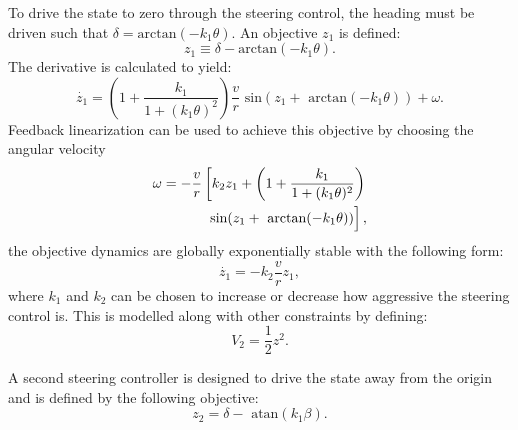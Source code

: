 \documentclass[conference]{IEEEtran}
\begin{document}
To drive the state to zero through the steering control, the heading must be driven such that $\delta = \text{arctan}(-k_1\theta).$ An objective $z_1$ is defined: 
\begin{equation}
z_1 \equiv \delta - \text{arctan}(-k_1\theta).
\label{z1}
\end{equation} The derivative is calculated to yield:
\begin{equation}
\dot{z_1}=\left( 1+\frac{k_1}{1+(k_1\theta)^2}\right) \frac{v}{r}\text{ sin}(z_1+\text{ arctan}(-k_1\theta))+\omega.
\end{equation}
Feedback linearization can be used to achieve this objective by choosing the angular velocity 
\begin{equation}
\begin{split}
\omega = -\frac{v}{r}\left[ k_2 z_1+\left( 1 + \frac{k_1}{1+(k_1\theta)^2} \right)\right.\\
\left. \vphantom{\frac{v}{r}} \text{sin}(z_1+\text{ arctan}(-k_1\theta))\right],
\end{split}
\end{equation}
the objective dynamics are globally exponentially stable with the following form: \begin{equation} \dot{z_1}=-k_2\frac{v}{r}z_1,\end{equation} where $k_1$ and $k_2$ can be chosen to increase or decrease how aggressive the steering control is. This is modelled along with other constraints by defining: 
\begin{equation} V_2 = \frac{1}{2}  z^2. \end{equation}

A second steering controller is designed to drive the state away from the origin and is defined by the following objective: \begin{equation}z_2=\delta-\text{ atan}(k_1\beta).\label{z2}\end{equation}
\end{document}
